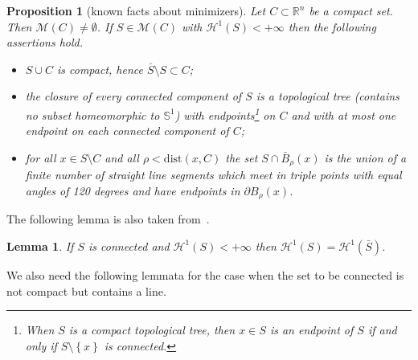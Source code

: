 \documentclass{amsart}
\newcommand{\RR}{\mathbb R}
\renewcommand{\H}{\mathcal H}
\newcommand{\ENCLOSE}[1]{\left\{#1\right\}}
\newcommand{\M}{\mathcal{M}}
\renewcommand{\H}{\mathcal{H}}
\newcommand{\dist}{\mathrm{dist}}
\newtheorem{proposition}[theorem]{Proposition}
\newtheorem{lemma}[theorem]{Lemma}
\theoremstyle{definition}
\theoremstyle{remark}
\begin{document}
\begin{proposition}[known facts about minimizers]\label{prop:PaoSte}
  Let $C\subset \RR^n$ be a compact set.
  Then $\M(C)\neq \emptyset$. If $S\in \M(C)$
  with $\H^1(S)<+\infty$
  then the following assertions hold.
  \begin{itemize}
    \item[(i)] $S\cup C$ is compact, 
    hence $\bar S \setminus S \subset C$;
    \item[(ii)] the closure of every connected component of $S$     
    is a topological tree 
    (contains no subset homeomorphic to $\mathbb S^1$)
    with endpoints\footnote{%
    When $S$ is a compact topological tree, then $x\in S$ is an endpoint 
    of $S$ if and only if $S\setminus \ENCLOSE{x}$ is connected.} 
    on $C$ and with at most one endpoint 
    on each connected component of $C$;
    \item[(iii)] for all $x\in S\setminus C$ and all 
    $\rho < \dist(x,C)$ the set $S\cap \bar B_\rho(x)$ 
    is the union of a finite number of straight line 
    segments which meet in triple points with equal 
    angles of 120 degrees and have endpoints in 
    $\partial B_\rho(x)$.
  \end{itemize}
\end{proposition}

The following lemma is also taken from~\cite[lemma~2.6]{PaoSte12}.

\begin{lemma}\label{lm:connected}
If $S$ is connected and $\H^1(S)<+\infty$ then $\H^1(S) = \H^1(\bar S)$.
\end{lemma}

We also need the following lemmata for the case when the set to 
be connected is not compact but contains a line.
\end{document}
